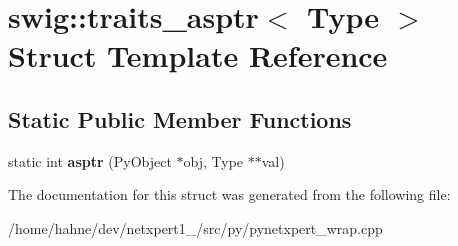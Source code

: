\hypertarget{structswig_1_1traits__asptr}{}\section{swig\+:\+:traits\+\_\+asptr$<$ Type $>$ Struct Template Reference}
\label{structswig_1_1traits__asptr}
\subsection*{Static Public Member Functions}
\begin{DoxyCompactItemize}
\item 
static int {\bfseries asptr} (Py\+Object $\ast$obj, Type $\ast$$\ast$val)\hypertarget{structswig_1_1traits__asptr_aa24007f1d4126e9a4162bce7bf231931}{}\label{structswig_1_1traits__asptr_aa24007f1d4126e9a4162bce7bf231931}

\end{DoxyCompactItemize}


The documentation for this struct was generated from the following file\+:\begin{DoxyCompactItemize}
\item 
/home/hahne/dev/netxpert1\+\_/src/py/pynetxpert\+\_\+wrap.\+cpp\end{DoxyCompactItemize}
